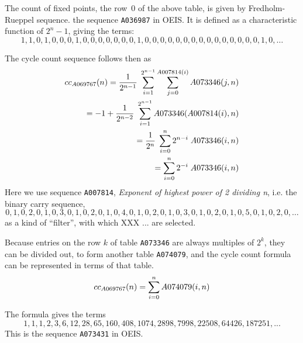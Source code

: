 \documentclass[11pt]{article} %
\newcommand{\eeq}{\end{equation}}
\newcommand{\beql}[1]{\begin{equation}\label{#1}}
\newcommand{\EISseq}[1]{{\tt #1}}
\begin{document}


The count of fixed points, the row~0 of the above table,
is given by Fredholm-Rueppel sequence. the sequence \EISseq{A036987}
in OEIS. It is defined as a characteristic function of $2^{n}-1$,
giving the terms:
$$
1,1,0,1,0,0,0,1,0,0,0,0,0,0,0,1,0,0,0,0,0,0,0,0,0,0,0,0,0,0,0,1,0,\hdots
$$

The cycle count sequence follows then as
\beql{EQcc_A069767v1} %
\aligned
cc_{A069767}(n) = {1 \over 2^{n-1}}\;\sum_{i=1}^{2^{n-1}} \sum_{j=0}^{A007814(i)} A073346(j,n)
\cr = -1 + {1\over 2^{n-2}}\;\sum_{i=1}^{2^{n-1}} A073346(A007814(i),n)
\cr = {1\over 2^n}\;\sum_{i=0}^n 2^{n-i}\;A073346(i,n)
\cr = \sum_{i=0}^n 2^{-i}\;A073346(i,n)
\endaligned
\eeq
Here we use sequence \EISseq{A007814}, {\em Exponent of highest power of 2
  dividing n},
i.e. the binary carry sequence,
$$
0,1,0,2,0,1,0,3,0,1,0,2,0,1,0,4,0,1,0,2,0,1,0,3,0,1,0,2,0,1,0,5,0,1,0,2,0,\hdots
$$
as a kind of ``filter'', with which XXX ... are selected.

Because entries on the row $k$ of table \EISseq{A073346} are
always multiples of $2^k$, they can be divided out, to form
another table \EISseq{A074079}, and the cycle count formula
can be represented in terms of that table.
\beql{EQcc_A069767v4} %
\aligned
cc_{A069767}(n) = \sum_{i=0}^{n} A074079(i,n)
\endaligned
\eeq


The formula gives the terms
$$
 1,1,1,2,3,6,12,28,65,160,408,1074,2898,7998,22508,64426,187251,...
$$
This is the sequence \EISseq{A073431} in OEIS.
\end{document}
